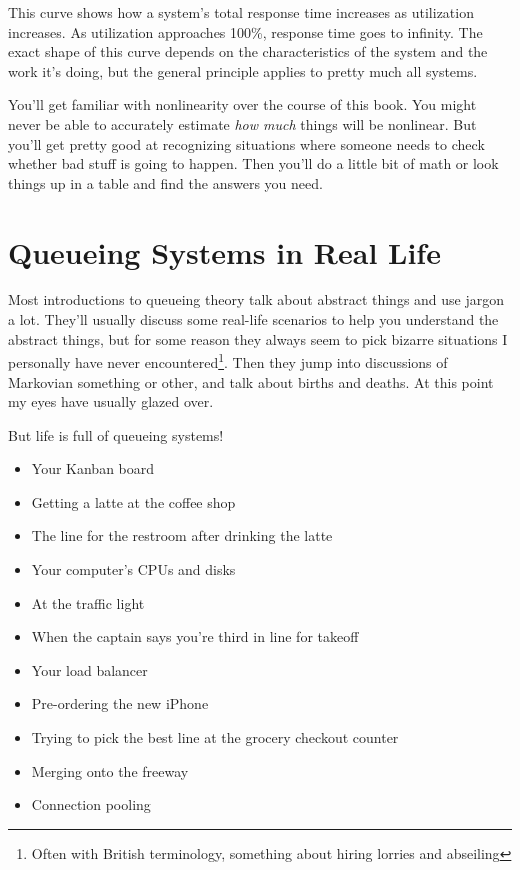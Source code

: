 \documentclass{vivid_layout}
\begin{document}
This curve shows how a system's total response time increases as utilization increases. As utilization approaches 100\%, response time goes to infinity. The exact shape of this curve depends on the characteristics of the system and the work it's doing, but the general principle applies to pretty much all systems.

You'll get familiar with nonlinearity over the course of this book. You might never be able to accurately estimate {\itshape how much} things will be nonlinear. But you'll get pretty good at recognizing situations where someone needs to check whether bad stuff is going to happen. Then you'll do a little bit of math or look things up in a table and find the answers you need.

\section{Queueing Systems in Real Life}	%

Most introductions to queueing theory talk about abstract things and use jargon a lot. They'll usually discuss some real-life scenarios to help you understand the abstract things, but for some reason they always seem to pick bizarre situations I personally have never encountered\footnote{Often with British terminology, something about hiring lorries and abseiling}. Then they jump into discussions of Markovian something or other, and talk about births and deaths. At this point my eyes have usually glazed over.

But life is full of queueing systems!
\begin{itemize}		%
\item Your Kanban board
\item Getting a latte at the coffee shop
\item The line for the restroom after drinking the latte
\item Your computer's CPUs and disks
\item At the traffic light
\item When the captain says you're third in line for takeoff
\item Your load balancer
\item Pre-ordering the new iPhone
\item Trying to pick the best line at the grocery checkout counter
\item Merging onto the freeway
\item Connection pooling
\end{itemize}
\end{document}
